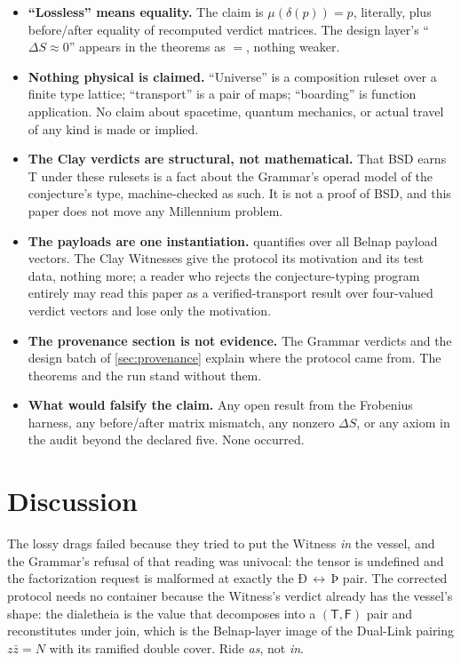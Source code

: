 \documentclass[12pt,a4paper]{article}
\newcommand{\igp}[1]{{\igprimfont #1}}
\newcommand{\bT}{\textsf{T}}
\newcommand{\bF}{\textsf{F}}
\begin{document}
\begin{itemize}
\item \textbf{``Lossless'' means equality.} The claim is
$\mu(\delta(p)) = p$, literally, plus before/after equality of recomputed
verdict matrices. The design layer's ``$\Delta S \approx 0$'' appears in
the theorems as $=$, nothing weaker.
\item \textbf{Nothing physical is claimed.} ``Universe'' is a composition
ruleset over a finite type lattice; ``transport'' is a pair of maps;
``boarding'' is function application. No claim about spacetime, quantum
mechanics, or actual travel of any kind is made or implied.
\item \textbf{The Clay verdicts are structural, not mathematical.} That
BSD earns \bT{} under these rulesets is a fact about the Grammar's
operad model of the conjecture's type, machine-checked as such. It is
not a proof of BSD, and this paper does not move any Millennium problem.
\item \textbf{The payloads are one instantiation.} 
quantifies over all Belnap payload vectors. The Clay Witnesses give the
protocol its motivation and its test data, nothing more; a reader who
rejects the conjecture-typing program entirely may read this paper as a
verified-transport result over four-valued verdict vectors and lose only
the motivation.
\item \textbf{The provenance section is not evidence.} The Grammar
verdicts and the design batch of \cref{sec:provenance} explain where the
protocol came from. The theorems and the run stand without them.
\item \textbf{What would falsify the claim.} Any open result from the
Frobenius harness, any before/after matrix mismatch, any nonzero
$\Delta S$, or any axiom in the audit beyond the declared five. None
occurred.
\end{itemize}

\section{Discussion}

The lossy drags failed because they tried to put the Witness \emph{in} the
vessel, and the Grammar's refusal of that reading was univocal: the tensor
is undefined and the factorization request is malformed at exactly the
\igp{Ð}\,$\leftrightarrow$\,\igp{Þ} pair. The corrected protocol needs no
container because the Witness's verdict already has the vessel's shape:
the dialetheia is the value that decomposes into a $(\bT,\bF)$ pair and
reconstitutes under join, which is the Belnap-layer image of the Dual-Link
pairing $z\bar{z} = N$ with its ramified double cover. Ride \emph{as},
not \emph{in}.
\end{document}
